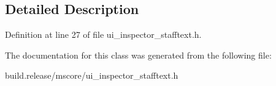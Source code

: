 \subsection{Detailed Description}


Definition at line 27 of file ui\+\_\+inspector\+\_\+stafftext.\+h.



The documentation for this class was generated from the following file\+:\begin{DoxyCompactItemize}
\item 
build.\+release/mscore/ui\+\_\+inspector\+\_\+stafftext.\+h\end{DoxyCompactItemize}
